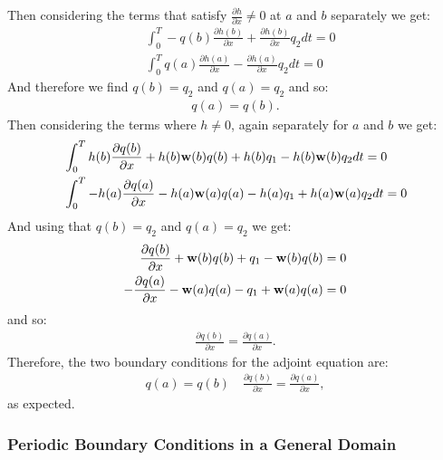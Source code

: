 Then considering the terms that satisfy $\frac{\partial h}{\partial x} \neq 0$ at $a$ and $b$ separately we get:
\begin{align*}
	&\int_0^T -q(b) \frac{\partial h(b)}{\partial x} + \frac{\partial h(b)}{\partial x} q_2 dt= 0\\
	& \int_0^T q(a) \frac{\partial h (a)}{\partial x} - \frac{\partial h(a)}{\partial x}q_2 dt =0
\end{align*}
	And therefore we find $q(b) = q_2$ and $q(a) = q_2$ and so: 
	\begin{align*}
		q(a) = q(b).
	\end{align*}
Then considering the terms where $h \neq 0$, again separately for $a$ and $b$ we get:
\begin{align*}
	&\int_0^T  h(b)\frac{\partial q(b)}{\partial x} + h(b) \mathbf{w}(b) q(b) + h(b)q_1 - h(b)\mathbf{w}(b)q_2 dt = 0\\
	&\int_0^T - h(a)\frac{\partial q(a)}{\partial x} - h(a) \mathbf{w}(a) q(a) - h(a)q_1 + h(a)\mathbf{w}(a)q_2 dt = 0
\end{align*}
	And using that $q(b) = q_2$ and $q(a) = q_2$ we get:
	\begin{align*}
		\frac{\partial q(b)}{\partial x} + \mathbf{w}(b) q(b) + q_1 - \mathbf{w}(b)q(b)  = 0\\
		- \frac{\partial q(a)}{\partial x} - \mathbf{w}(a) q(a) - q_1 + \mathbf{w}(a)q(a)  = 0
	\end{align*}
	and so:
	\begin{align*}
		\frac{\partial q(b)}{\partial x}  = \frac{\partial q(a)}{\partial x}. 
	\end{align*}
	Therefore, the two boundary conditions for the adjoint equation are:
	\begin{align*}
		q(a) = q(b) \quad \frac{\partial q(b)}{\partial x}  = \frac{\partial q(a)}{\partial x},
	\end{align*}
	as expected.
	
	\subsubsection{Periodic Boundary Conditions in a General Domain}
	
